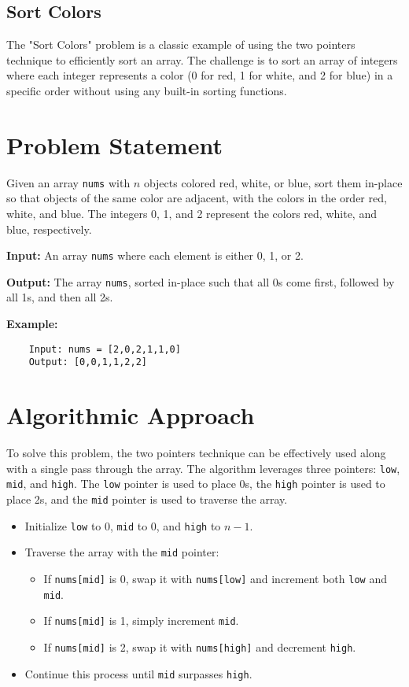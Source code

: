 
\subsection{Sort Colors}
\label{subsec:Sort_Colors}

The "Sort Colors" problem is a classic example of using the two pointers technique to efficiently sort an array. The challenge is to sort an array of integers where each integer represents a color (0 for red, 1 for white, and 2 for blue) in a specific order without using any built-in sorting functions.

\section*{Problem Statement}
Given an array \texttt{nums} with \(n\) objects colored red, white, or blue, sort them in-place so that objects of the same color are adjacent, with the colors in the order red, white, and blue. The integers 0, 1, and 2 represent the colors red, white, and blue, respectively.

\textbf{Input:} An array \texttt{nums} where each element is either 0, 1, or 2.

\textbf{Output:} The array \texttt{nums}, sorted in-place such that all 0s come first, followed by all 1s, and then all 2s.

\textbf{Example:}
\begin{verbatim}
    Input: nums = [2,0,2,1,1,0]
    Output: [0,0,1,1,2,2]
\end{verbatim}


\section*{Algorithmic Approach}
To solve this problem, the two pointers technique can be effectively used along with a single pass through the array. The algorithm leverages three pointers: \texttt{low}, \texttt{mid}, and \texttt{high}. The \texttt{low} pointer is used to place 0s, the \texttt{high} pointer is used to place 2s, and the \texttt{mid} pointer is used to traverse the array.

\begin{itemize}
    \item Initialize \texttt{low} to 0, \texttt{mid} to 0, and \texttt{high} to \(n-1\).
    \item Traverse the array with the \texttt{mid} pointer:
        \begin{itemize}
            \item If \texttt{nums[mid]} is 0, swap it with \texttt{nums[low]} and increment both \texttt{low} and \texttt{mid}.
            \item If \texttt{nums[mid]} is 1, simply increment \texttt{mid}.
            \item If \texttt{nums[mid]} is 2, swap it with \texttt{nums[high]} and decrement \texttt{high}.
        \end{itemize}
    \item Continue this process until \texttt{mid} surpasses \texttt{high}.
\end{itemize}

